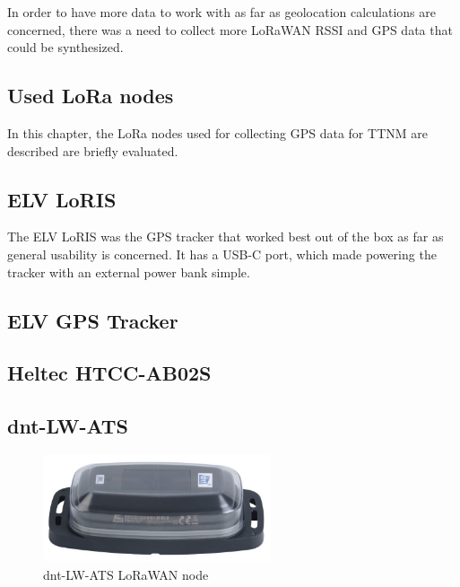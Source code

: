 In order to have more data to work with as far as geolocation calculations are concerned, there was a need to collect more \ac{LoRaWAN} \ac{RSSI} and \ac{GPS} data that could be synthesized.

\subsection{Used \ac{LoRa} nodes}

In this chapter, the \ac{LoRa} nodes used for collecting \ac{GPS} data for \ac{TTNM} are described are briefly evaluated.

\subsection{ELV LoRIS}


The ELV LoRIS was the \ac{GPS} tracker that worked best out of the box as far as general usability is concerned.
It has a USB-C port, which made powering the tracker with an external power bank simple.


\subsection{ELV \ac{GPS} Tracker}


\subsection{Heltec HTCC-AB02S}


\subsection{dnt-LW-ATS}

\begin{figure}[h]
    \centering
    \includegraphics[width=0.6\textwidth]{pictures/hardware/gps-nodes/dnt-LW-ATS.jpg}
    \caption{dnt-LW-ATS \ac{LoRaWAN} node~\protect\cite{dnt_gmbh_dnt_nodate}}
\end{figure}

